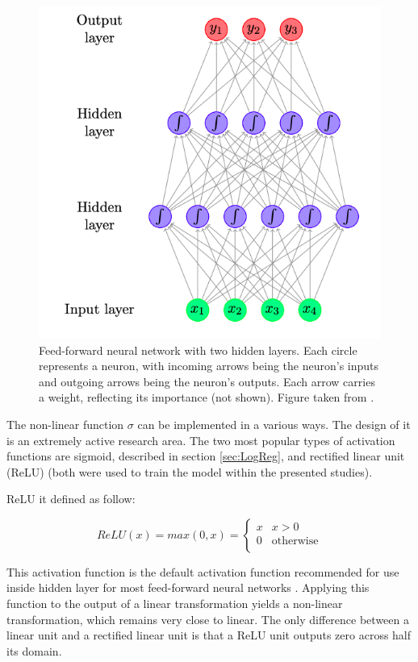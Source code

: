 \begin{figure}[!ht]
\centering
\includegraphics[scale=0.7]{figures/NN.png}
\caption{ Feed-forward neural network with two hidden layers.  Each circle represents a neuron, with incoming arrows being the neuron’s inputs and outgoing arrows being the neuron’s outputs. Each arrow carries a weight, reflecting its importance (not shown). Figure taken from \cite{text_processing}.
}
\label{fig:NN}
\end{figure} 
 
 
The non-linear function $\sigma$ can be implemented in a various ways. The design of it is an extremely active research area. The two most popular types of activation functions are sigmoid, described in section \ref{sec:LogReg}, and rectified linear unit (ReLU) (both were used to train the model within the presented studies).

ReLU \cite{relu} it defined as follow: 

\begin{equation}
ReLU(x) = max(0,x)= \left\{ \begin{array}{ll}
x & x>0\\
0 & \textrm{otherwise}\\
\end{array} \right.
\end{equation}

This activation function is the default activation function recommended for use inside hidden layer for most feed-forward neural networks \cite{DLBook}. Applying this function to the output of a linear transformation yields a non-linear transformation, which remains very close to linear. The only diﬀerence between a linear unit and a rectiﬁed linear unit is that a ReLU unit outputs zero across half its domain. 


